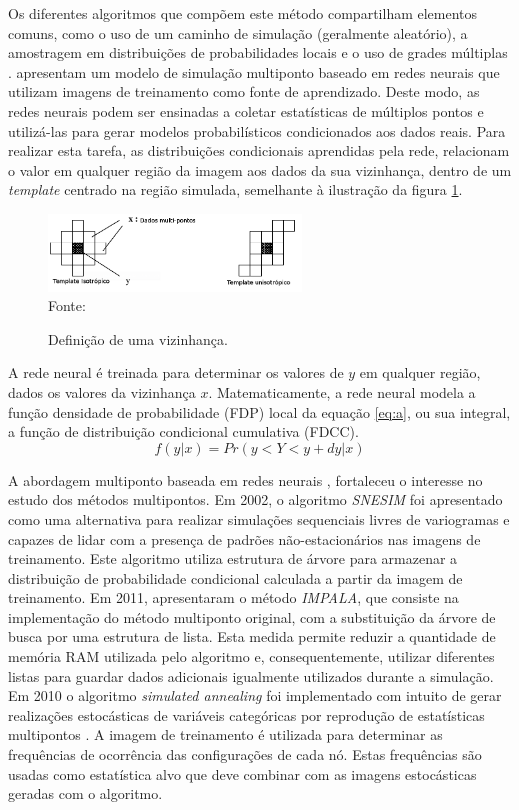 \documentclass[11pt]{article}
\begin{document}
Os diferentes algoritmos que compõem este método compartilham elementos comuns, como o uso de um caminho
de simulação (geralmente aleatório), a amostragem em distribuições de probabilidades locais e o uso de grades múltiplas \cite{Mariethoz2014_A}.
\cite{caers_1998} apresentam um modelo de simulação multiponto baseado em redes neurais que utilizam imagens de treinamento
como fonte de aprendizado. Deste modo, as redes neurais podem ser ensinadas a coletar estatísticas de múltiplos pontos e utilizá-las
para gerar modelos probabilísticos condicionados aos dados reais. Para realizar esta tarefa, as distribuições condicionais aprendidas
pela rede, relacionam o valor em qualquer região da imagem aos dados da sua vizinhança, dentro de um \emph{template} centrado na região
simulada, semelhante à ilustração da figura \ref{fig:templates}.
\begin{figure}[!htb]
   \centering
   \caption{Definição de uma vizinhança.}\label{fig:templates}
   \includegraphics[width=0.6\textwidth]{figuras/templates.png} \\
   \small{Fonte: \cite{caers_1998}}
\end{figure}
A rede neural é treinada para determinar os valores de $y$ em qualquer região, dados os valores da vizinhança $x$. Matematicamente,
a rede neural modela a função densidade de probabilidade (FDP) local da equação \ref{eq:a}, ou sua integral, a função de distribuição condicional cumulativa (FDCC).
\begin{equation}
 f(y|x) = Pr({y<Y<y+dy|x})
 \label{eq:a}
\end{equation}

A abordagem multiponto baseada em redes neurais \cite{caers_1998}, fortaleceu o
interesse no estudo dos métodos multipontos. Em 2002, o algoritmo \emph{SNESIM} \cite{Strebelle2002_B} foi apresentado como uma alternativa
para realizar simulações sequenciais livres de variogramas e capazes de lidar com a presença de padrões não-estacionários
nas imagens de treinamento. Este algoritmo utiliza estrutura de árvore para armazenar a distribuição de probabilidade condicional
calculada a partir da imagem de treinamento. Em 2011, \cite{Straubhaar2011} apresentaram o método \emph{IMPALA}, 
que consiste na implementação do método multiponto original, com a substituição da árvore de busca por uma estrutura de lista.
Esta medida permite reduzir a quantidade de memória RAM utilizada pelo algoritmo e, consequentemente, utilizar diferentes
listas para guardar dados adicionais igualmente utilizados durante a simulação. 
Em 2010 o algoritmo \emph{simulated annealing} foi implementado com intuito de gerar realizações estocásticas de variáveis
categóricas por reprodução de estatísticas multipontos \cite{Peredo20111110}. A imagem de treinamento é
utilizada para determinar as frequências de ocorrência das configurações de cada nó. Estas frequências são
usadas como estatística alvo que deve combinar com as imagens estocásticas geradas com o algoritmo. 
\end{document}
